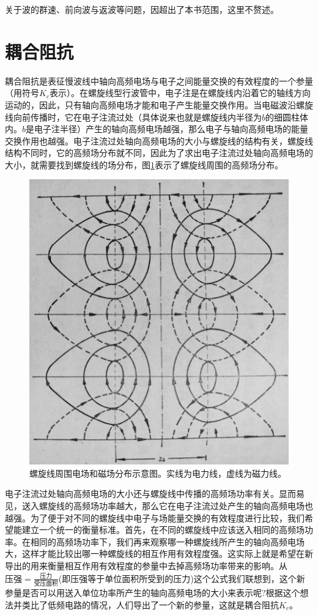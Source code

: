 关于波的群速、前向波与返波等问题，因超出了本书范围，这里不赘述。
\section{耦合阻抗}
耦合阻抗是表征慢波线中轴向高频电场与电子之间能量交换的有效程度的一个参量（用符号$ K_c $表示）。在螺旋线型行波管中，电子注是在螺旋线内沿着它的轴线方向运动的，因此，只有轴向高频电场才能和电子产生能量交换作用。当电磁波沿螺旋线向前传播时，它在电子注流过处（具体说来也就是螺旋线内半径为$ b $的细圆柱体内。$ b $是电子注半径）产生的轴向高频电场越强，那么电子与轴向高频电场的能量交换作用也越强。电子注流过处轴向高频电场的大小与螺旋线的结构有关，螺旋线结构不同时，它的高频场分布就不同，因此为了求出电子注流过处轴向高频电场的大小，就需要找到螺旋线的场分布，图\ref{ch3-5}表示了螺旋线周围的高频场分布。

\begin{figure}[phtb]
	\centering
	\includegraphics[width=0.55\linewidth,angle=90]{figure/ch3-5}
	\caption{螺旋线周围电场和磁场分布示意图。实线为电力线，虚线为磁力线。}
	\label{ch3-5}
\end{figure}

电子注流过处轴向高频电场的大小还与螺旋线中传播的高频场功率有关。显而易见，送入螺旋线的高频场功率越大，那么它在电子注流过处产生的轴向高频电场也越强。为了便于对不同的螺旋线中电子与场能量交换的有效程度进行比较，我们希望能建立一个统一的衡量标准。首先，在不同的螺旋线中应该送入相同的高频场功率。在相同的高频场功率下，我们再来观察哪一种螺旋线所产生的轴向高频电场大，这样才能比较出哪一种螺旋线的相互作用有效程度强。这实际上就是希望在新导出的用来衡量相互作用有效程度的参量中去掉高频场功率带来的影响。从$\text{压强}= \frac{\text{压力}}{\text{受压面积}} $(即压强等于单位面积所受到的压力)这个公式我们联想到，这个新参量是否可以用送入单位功率所产生的轴向高频电场的大小来表示呢?根据这个想法并类比了低频电路的情况，人们导出了一个新的参量，这就是耦合阻抗$ K_c $。

